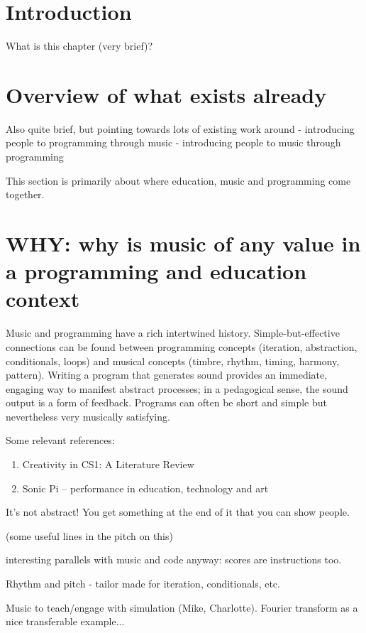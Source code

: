 \section{Introduction}
What is this chapter (very brief)?

\section{Overview of what exists already}
Also quite brief, but pointing towards lots of existing work around
 - introducing people to programming through music
 - introducing people to music through programming

 This section is primarily about where education, music and programming come together.

 

\section{WHY: why is music of any value in a programming and education context}

Music and programming have a rich intertwined history. Simple-but-effective connections can be found between programming concepts (iteration, abstraction, conditionals, loops) and musical concepts (timbre, rhythm, timing, harmony, pattern). Writing a program that generates sound provides an immediate, engaging way to manifest abstract processes; in a pedagogical sense, the sound output is a form of feedback. Programs can often be short and simple but nevertheless very musically satisfying. 

Some relevant references:
\begin{enumerate}
\item Creativity in CS1: A Literature Review \cite{Sharmin2021}
\item Sonic Pi – performance in education, technology and art \cite{Aaron2016}
\end{enumerate}

It's not abstract! You get something at the end of it that you can show people.

(some useful lines in the pitch on this)

interesting parallels with music and code anyway: scores are instructions too.

Rhythm and pitch - tailor made for iteration, conditionals, etc.

Music to teach/engage with simulation (Mike, Charlotte). Fourier transform as a nice transferable example...


